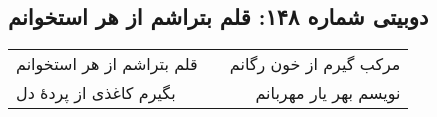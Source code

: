 \begin{center}
\section*{دوبیتی شماره ۱۴۸: قلم بتراشم از هر استخوانم}
\label{sec:148}
\begin{longtable}{l p{0.5cm} r}
قلم بتراشم از هر استخوانم
&&
مرکب گیرم از خون رگانم
\\
بگیرم کاغذی از پردهٔ دل
&&
نویسم بهر یار مهربانم
\\
\end{longtable}
\end{center}

